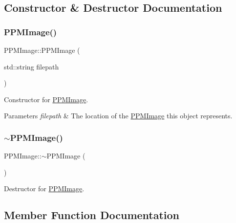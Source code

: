 \subsection{Constructor \& Destructor Documentation}
\mbox{\label{classPPMImage_a0115b29f89aa37df9c2b464602975db4}} 
\subsubsection{\texorpdfstring{P\+P\+M\+Image()}{PPMImage()}}
{\footnotesize\ttfamily P\+P\+M\+Image\+::\+P\+P\+M\+Image (\begin{DoxyParamCaption}\item[{std\+::string}]{filepath }\end{DoxyParamCaption})}

Constructor for \hyperlink{classPPMImage}{P\+P\+M\+Image}.


\begin{DoxyParams}{Parameters}
{\em filepath} & The location of the \hyperlink{classPPMImage}{P\+P\+M\+Image} this object represents. \\
\hline
\end{DoxyParams}
\mbox{\label{classPPMImage_a5e7deaacad136e95057381bb0b30e25a}} 
\subsubsection{\texorpdfstring{$\sim$\+P\+P\+M\+Image()}{~PPMImage()}}
{\footnotesize\ttfamily P\+P\+M\+Image\+::$\sim$\+P\+P\+M\+Image (\begin{DoxyParamCaption}{ }\end{DoxyParamCaption})}

Destructor for \hyperlink{classPPMImage}{P\+P\+M\+Image}. 

\subsection{Member Function Documentation}
\mbox{\label{classPPMImage_a3c6700065f9512bbc03873f0400fca4a}} 
